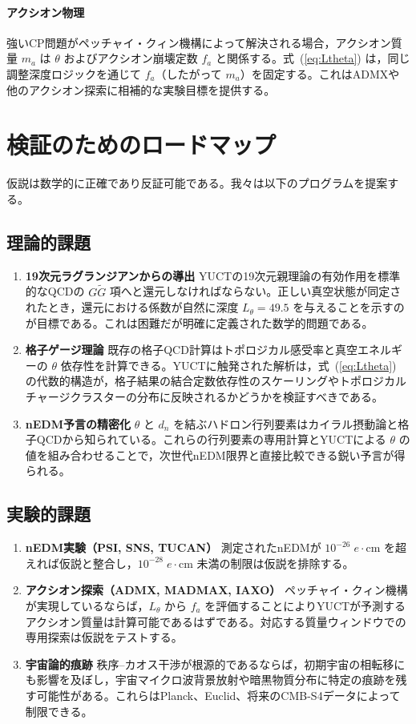 \documentclass[11pt,a4paper]{article}
\begin{document}
	\paragraph{アクシオン物理}
	強いCP問題がペッチャイ・クィン機構によって解決される場合，アクシオン質量 \(m_a\) は \(\theta\) およびアクシオン崩壊定数 \(f_a\) と関係する。式~(\ref{eq:Ltheta}) は，同じ調整深度ロジックを通じて \(f_a\)（したがって \(m_a\)）を固定する。これはADMXや他のアクシオン探索に相補的な実験目標を提供する。
	
	\section{検証のためのロードマップ}
	\label{sec:roadmap}
	
	仮説は数学的に正確であり反証可能である。我々は以下のプログラムを提案する。
	
	\subsection{理論的課題}
	\begin{enumerate}
		\item \textbf{19次元ラグランジアンからの導出} YUCTの19次元親理論の有効作用を標準的なQCDの \(G\widetilde{G}\) 項へと還元しなければならない。正しい真空状態が同定されたとき，還元における係数が自然に深度 \(L_\theta = 49.5\) を与えることを示すのが目標である。これは困難だが明確に定義された数学的問題である。
		\item \textbf{格子ゲージ理論} 既存の格子QCD計算はトポロジカル感受率と真空エネルギーの \(\theta\) 依存性を計算できる。YUCTに触発された解析は，式~(\ref{eq:Ltheta}) の代数的構造が，格子結果の結合定数依存性のスケーリングやトポロジカルチャージクラスターの分布に反映されるかどうかを検証すべきである。
		\item \textbf{nEDM予言の精密化} \(\theta\) と \(d_n\) を結ぶハドロン行列要素はカイラル摂動論と格子QCDから知られている。これらの行列要素の専用計算とYUCTによる \(\theta\) の値を組み合わせることで，次世代nEDM限界と直接比較できる鋭い予言が得られる。
	\end{enumerate}
	
	\subsection{実験的課題}
	\begin{enumerate}
		\item \textbf{nEDM実験（PSI, SNS, TUCAN）} 測定されたnEDMが \(10^{-26}\;e\!\cdot\!\mathrm{cm}\) を超えれば仮説と整合し，\(10^{-28}\;e\!\cdot\!\mathrm{cm}\) 未満の制限は仮説を排除する。
		\item \textbf{アクシオン探索（ADMX, MADMAX, IAXO）} ペッチャイ・クィン機構が実現しているならば，\(L_\theta\) から \(f_a\) を評価することによりYUCTが予測するアクシオン質量は計算可能であるはずである。対応する質量ウィンドウでの専用探索は仮説をテストする。
		\item \textbf{宇宙論的痕跡} 秩序–カオス干渉が根源的であるならば，初期宇宙の相転移にも影響を及ぼし，宇宙マイクロ波背景放射や暗黒物質分布に特定の痕跡を残す可能性がある。これらはPlanck、Euclid、将来のCMB-S4データによって制限できる。
	\end{enumerate}
	
\end{document}
